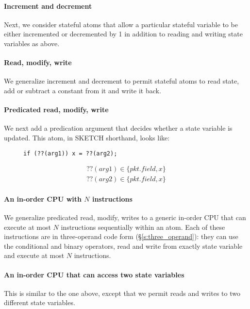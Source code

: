 \paragraph{Increment and decrement}
Next, we consider stateful atoms that allow a particular stateful variable to
be either incremented or decremented by 1 in addition to reading and writing
state variables as above.

\paragraph{Read, modify, write}
We generalize increment and decrement to permit stateful atoms to read state,
add or subtract a constant from it and write it back.

\paragraph{Predicated read, modify, write}
We next add a predication argument that decides whether a state variable is
updated. This atom, in SKETCH shorthand, looks like:
\begin{figure}
\begin{lstlisting}[style=customc]
  if (??(arg1)) x = ??(arg2);
\end{lstlisting}
\begin{eqnarray*}
  ??(arg1) \in \{pkt.field, x\} \\
  ??(arg2) \in \{pkt.field, x\}
\end{eqnarray*}
\end{figure}

\paragraph{An in-order CPU with $N$ instructions}
We generalize predicated read, modify, writes to a generic in-order CPU that
can execute at most $N$ instructions sequentially within an atom. Each of these
instructions are in three-operand code form (\S\ref{s:three_operand}): they can
use the conditional and binary operators, read and write from exactly state
variable and execute at most $N$ instructions.

\paragraph{An in-order CPU that can access two state variables}
This is similar to the one above, except that we permit reads and writes to two
different state variables.


